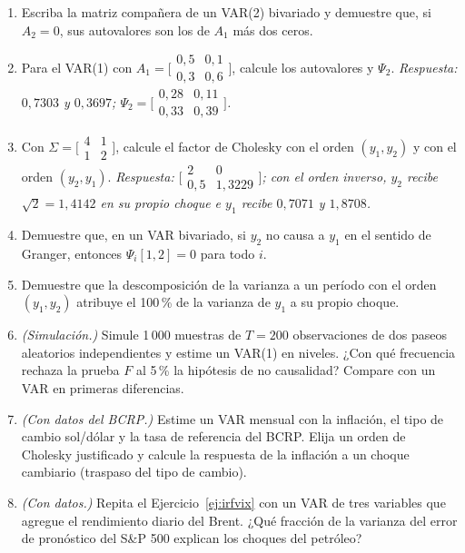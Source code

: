 \begin{enumerate}[label=\textbf{\thechapter.\arabic*},leftmargin=*,itemsep=6pt]
  \item Escriba la matriz compañera de un VAR(2) bivariado y demuestre que, si $A_2=0$, sus autovalores son los
  de $A_1$ más dos ceros.

  \item Para el VAR(1) con $A_1=\bigl[\begin{smallmatrix}0{,}5&0{,}1\\0{,}3&0{,}6\end{smallmatrix}\bigr]$, calcule
  los autovalores y $\Psi_2$. \textit{Respuesta: $0{,}7303$ y $0{,}3697$;
  $\Psi_2=\bigl[\begin{smallmatrix}0{,}28&0{,}11\\0{,}33&0{,}39\end{smallmatrix}\bigr]$.}

  \item Con $\Sigma=\bigl[\begin{smallmatrix}4&1\\1&2\end{smallmatrix}\bigr]$, calcule el factor de Cholesky
  con el orden $(y_1,y_2)$ y con el orden $(y_2,y_1)$. \textit{Respuesta:
  $\bigl[\begin{smallmatrix}2&0\\0{,}5&1{,}3229\end{smallmatrix}\bigr]$; con el orden inverso, $y_2$ recibe
  $\sqrt2=1{,}4142$ en su propio choque e $y_1$ recibe $0{,}7071$ y $1{,}8708$.}

  \item Demuestre que, en un VAR bivariado, si $y_2$ no causa a $y_1$ en el sentido de Granger, entonces
  $\Psi_i[1,2]=0$ para todo $i$.

  \item Demuestre que la descomposición de la varianza a un período con el orden $(y_1,y_2)$ atribuye el
  100\,\% de la varianza de $y_1$ a su propio choque.

  \item \emph{(Simulación.)} Simule 1\,000 muestras de $T=200$ observaciones de dos paseos aleatorios
  independientes y estime un VAR(1) en niveles. ¿Con qué frecuencia rechaza la prueba $F$ al 5\,\% la hipótesis
  de no causalidad? Compare con un VAR en primeras diferencias.

  \item \emph{(Con datos del BCRP.)} Estime un VAR mensual con la inflación, el tipo de cambio sol/dólar y la
  tasa de referencia del BCRP. Elija un orden de Cholesky justificado y calcule la respuesta de la inflación a
  un choque cambiario (traspaso del tipo de cambio).

  \item \emph{(Con datos.)} Repita el Ejercicio~\ref{ej:irfvix} con un VAR de tres variables que agregue el
  rendimiento diario del Brent. ¿Qué fracción de la varianza del error de pronóstico del S\&P 500 explican los
  choques del petróleo?
\end{enumerate}


